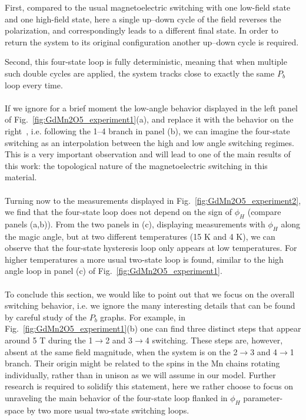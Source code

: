 First, compared to the usual magnetoelectric switching with one low-field state and one high-field state, here a single up--down cycle of the field reverses the polarization, and correspondingly leads to a different final state.
In order to return the system to its original configuration another up--down cycle is required.

Second, this four-state loop is fully deterministic, meaning that when multiple such double cycles are applied, the system tracks close to exactly the same $P_b$ loop every time.
\\\\
If we ignore for a brief moment the low-angle behavior displayed in the left panel of Fig.~\ref{fig:GdMn2O5_experiment1}(a), and replace it with the behavior on the right~\cite{Lee13}, i.e. following the 1--4 branch in panel (b), we can imagine the four-state switching as an interpolation between the high and low angle switching regimes.
This is a very important observation and will lead to one of the main results of this work: the topological nature of the magnetoelectric switching in this material.
\\\\
Turning now to the measurements displayed in Fig.~\ref{fig:GdMn2O5_experiment2}, we find that the four-state loop does not depend on the sign of $\phi_H$ (compare panels (a,b)).
From the two panels in (c), displaying measurements with $\phi_H$ along the magic angle, but at two different temperatures (15 K and 4 K), we can observe that the four-state hysteresis loop only appears at low temperatures.
For higher temperatures a more usual two-state loop is found, similar to the high angle loop in panel (c) of Fig.~\ref{fig:GdMn2O5_experiment1}.
\\\\
To conclude this section, we would like to point out that we focus on the overall switching behavior, i.e. we ignore the many interesting details that can be found by careful study of the $P_b$ graphs.
For example, in Fig.~\ref{fig:GdMn2O5_experiment1}(b) one can find three distinct steps that appear around 5 T during the 1$\rightarrow$2 and 3$\rightarrow$4 switching.
These steps are, however, absent at the same field magnitude, when the system is on the 2$\rightarrow$3 and 4$\rightarrow$1 branch.
Their origin might be related to the spins in the Mn chains rotating individually, rather than in unison as we will assume in our model.
Further research is required to solidify this statement, here we rather choose to focus on unraveling the main behavior of the four-state loop flanked in $\phi_H$ parameter-space by two more usual two-state switching loops.


